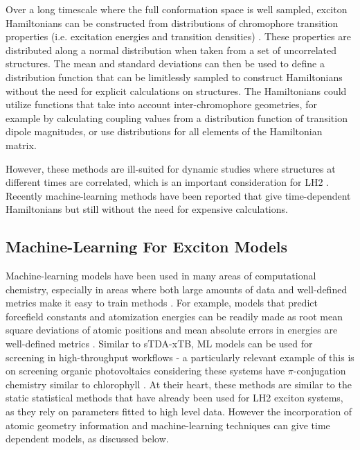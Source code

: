 Over a long timescale where the full conformation space is well sampled, exciton
Hamiltonians can be constructed from distributions of chromophore transition properties
(i.e. excitation energies and transition densities) \cite{Stross2016}. These properties
are distributed along a normal distribution when taken from a set of uncorrelated 
structures. The mean and standard deviations can then be used to define a distribution
function that can be limitlessly sampled to construct Hamiltonians without the 
need for explicit calculations on structures. The Hamiltonians could utilize functions
that take into account inter-chromophore geometries, for example by calculating 
coupling values from a distribution function of transition dipole magnitudes, or
use distributions for all elements of the Hamiltonian matrix.

However, these methods are ill-suited for dynamic studies where structures at different
times are correlated, which is an important consideration for LH2 \cite{Papiz2003}.
Recently machine-learning methods have been reported that give time-dependent Hamiltonians
but still without the need for expensive calculations.

\subsection{Machine-Learning For Exciton Models}
\label{subsec:machine_learning} 

Machine-learning models have been used in many areas of computational chemistry,
especially in areas where both large amounts of data and well-defined metrics make 
it easy to train  methods \cite{Dral2020, Behler2011, Westermayr2020, Schutt2019, Sajjan2022}.
For example, models that predict forcefield constants and atomization energies can
be readily made as root mean square deviations of atomic positions and mean absolute 
errors in energies are well-defined metrics  \cite{Rupp2012, Dick2019, Scherer2020}.
Similar to sTDA-xTB, ML models can be used for screening in high-throughput workflows 
- a particularly relevant example of this is on screening organic photovoltaics 
considering these systems have $\pi$-conjugation chemistry similar to chlorophyll \cite{Zhao2022}.
At their heart, these methods are similar to the static statistical methods that
have already been used for LH2 exciton systems, as they rely on parameters fitted to
high level data. However the incorporation of atomic geometry information and machine-learning
techniques can give time dependent models, as discussed below.

